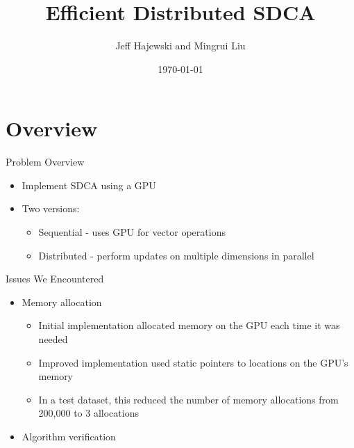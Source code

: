 \documentclass{beamer}
\title{Efficient Distributed SDCA}
\author{Jeff Hajewski and Mingrui Liu}
\date{\today}
\institute{University of Iowa}
\begin{document}
\maketitle
\section{Overview}
\begin{frame}{Problem Overview}
    \begin{itemize}
        \item Implement SDCA using a GPU
        \item Two versions:
            \begin{itemize}
                \item Sequential - uses GPU for vector operations
                \item Distributed - perform updates on multiple dimensions in
                    parallel
            \end{itemize}
    \end{itemize}

\end{frame}

\begin{frame}{Issues We Encountered}
    \begin{itemize}
        \item Memory allocation
            \begin{itemize}
                \item Initial implementation allocated memory on the GPU each
                    time it was needed
                \item Improved implementation used static pointers to locations
                    on the GPU's memory
                \item In a test dataset, this reduced the number of memory
                    allocations from 200,000 to 3 allocations
            \end{itemize}
        \item Algorithm verification
    \end{itemize}

\end{frame}
\end{document}
